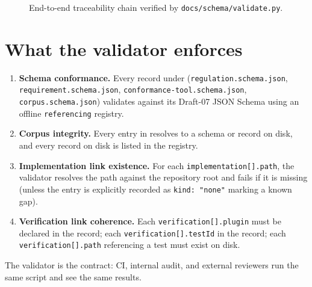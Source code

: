 \begin{figure}[h]
\centering
{}
\caption{End-to-end traceability chain verified by \texttt{docs/schema/validate.py}.}
\label{fig:traceability}
\end{figure}

\section{What the validator enforces}

\begin{enumerate}
  \item \textbf{Schema conformance.} Every record under
        (\texttt{regulation.schema.json}, \texttt{requirement.schema.json},
        \texttt{conformance-tool.schema.json},
        \texttt{corpus.schema.json}) validates against its Draft-07 JSON
        Schema using an offline \texttt{referencing} registry.
  \item \textbf{Corpus integrity.} Every entry in
         resolves to a schema or record on
        disk, and every record on disk is listed in the registry.
  \item \textbf{Implementation link existence.} For each
        \texttt{implementation[].path}, the validator resolves the path
        against the repository root and fails if it is missing (unless the
        entry is explicitly recorded as \texttt{kind: "none"} marking a
        known gap).
  \item \textbf{Verification link coherence.} Each
        \texttt{verification[].plugin} must be declared in the
         record; each \texttt{verification[].testId} in the
         record; each \texttt{verification[].path}
        referencing a test must exist on disk.
\end{enumerate}

The validator is the contract: CI, internal audit, and external reviewers
run the same script and see the same results.
\clearpage
